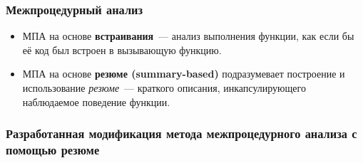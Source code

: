 \documentclass[10pt,gray]{beamer}
\begin{document}

\begin{frame}
\frametitle{Межпроцедурный анализ}
\begin{figure}[h]
\end{figure}


\begin{itemize}
 \item МПА на основе \textbf{встраивания}~--- анализ выполнения функции, как если бы её код был встроен в вызывающую функцию.
 \item МПА на основе \textbf{резюме (summary-based)} подразумевает построение и использование \textit{резюме}~--- краткого описания, инкапсулирующего наблюдаемое поведение функции.
\end{itemize}

\end{frame}


\begin{frame}
\frametitle{Разработанная модификация метода межпроцедурного анализа с помощью резюме}
\begin{figure}[h]
\end{figure}
\end{frame}
\end{document}

